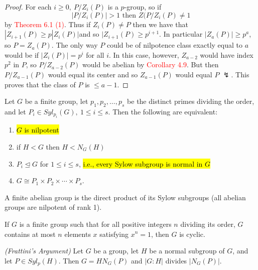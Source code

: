 \begin{proof}
For each $i\geq 0,\ P/Z_i(P)$ is a $p$-group, so if 
\[|P/Z_i(P)| > 1\text{ then } Z(P/Z_i(P)\neq 1\]
by \textcolor{red}{Theorem 6.1 (1)}. Thus if $Z_i(P)\neq P$ then we have that $|Z_{i + 1}(P) \geq p|Z_i(P)|$and so $|Z_{i+1}(P)\geq p^{i+1}$. In particular $|Z_a(P)|\geq p^a$, so $P = Z_a(P)$. The only way $P$ could be of nilpotence class exactly equal to $a$ would be if $|Z_i(P)| = p^i$ for all $i$. In this case, however, $Z_{a-2}$ would have index $p^2$ in $P$, so $P/Z_{a-2}(P)$ would be abelian by \textcolor{red}{Corollary 4.9}. But then $P/Z_{a-1}(P)$ would equal its center and so $Z_{a-1}(P)$ would equal $P$ $\lightning$. This proves that the class of $P$ is $\leq a-1$.
\end{proof}

\nl

\begin{thm}
Let $G$ be a finite group, let $p_1, p_2, \ldots,p_s$ be the distinct primes dividing the order, and let $P_i\in Syl_{p_i}(G),\ 1\leq i\leq s$. Then the following are equivalent:
\begin{enumerate}
\item \hl{$G$ is nilpotent}
\item if $H<G$ then $H<N_G(H)$
\item $P_i\unlhd G$ for $1\leq i\leq s$, \hl{i.e., every Sylow subgroup is normal in $G$}
\item $G\cong P_1\times P_2\times \cdots\times P_s$.
\end{enumerate}
\end{thm}

\nl

\begin{cor}
A finite abelian group is the direct product of its Sylow subgroups (all abelian groups are nilpotent of rank 1).
\end{cor}


\nl

\begin{prop}
If $G$ is a finite group such that for all positive integers $n$ dividing its order, $G$ contains at most $n$ elements $x$ satisfying $x^n = 1$, then $G$ is cyclic.
\end{prop}

\nl

\begin{prop}\textit{(Frattini's Argument)}
Let $G$ be a group, let $H$ be a normal subgroup of $G$, and let $P\in Syl_p(H)$. Then $G=HN_G(P)$ and $|G:H|$ divides $|N_G(P)|$.
\end{prop}

